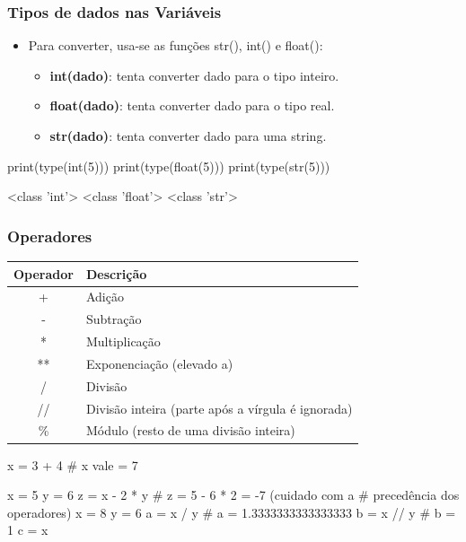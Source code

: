 \documentclass{beamer}
\begin{document}
\begin{frame}[fragile]
  \frametitle{Tipos de dados nas Variáveis}

  \begin{itemize}
    \vfill \item Para converter, usa-se as funções str(), int() e float():
    \begin{itemize}
      \vfill \item \textbf{int(dado)}: tenta converter dado para o tipo inteiro.
      \vfill \item \textbf{float(dado)}: tenta converter dado para o tipo real.
      \vfill \item \textbf{str(dado)}: tenta converter dado para uma string.
    \end{itemize}
  \end{itemize}

\vfill \begin{python}
print(type(int(5)))
print(type(float(5)))
print(type(str(5)))
\end{python}

\vfill \begin{python}
<class 'int'>
<class 'float'>
<class 'str'>
\end{python} 
\end{frame}

\begin{frame}[fragile]

  \frametitle{Operadores}

  \begin{center}
    \scriptsize
    \begin{tabular}{|c|l}
    Operador  & Descrição  \\ \hline
    +     & Adição \\                        
    -     & Subtração \\ 
    *     & Multiplicação  \\
    **    & Exponenciação (elevado a)  \\
    /     & Divisão \\
    //    & Divisão inteira  (parte após a vírgula é ignorada) \\
    \%    & Módulo (resto de uma divisão inteira)  
    \end{tabular}
  \end{center}
\end{frame}
  
\begin{frame}[fragile]
\begin{python}
x = 3 + 4   # x vale = 7

x = 5
y = 6
z = x - 2 * y   # z = 5 - 6 * 2 = -7 (cuidado com a 
                # precedência dos operadores)
x = 8
y = 6
a = x / y     # a = 1.3333333333333333
b = x // y    # b = 1
c = x %
\end{python} 
\end{frame}
\end{document}
